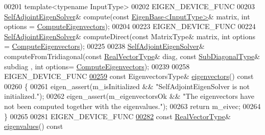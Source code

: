 \begin{DoxyCode}
00201     \textcolor{keyword}{template}<\textcolor{keyword}{typename} InputType>
00202     EIGEN\_DEVICE\_FUNC
00203     \hyperlink{group___eigenvalues___module_class_eigen_1_1_self_adjoint_eigen_solver}{SelfAdjointEigenSolver}& compute(\textcolor{keyword}{const} 
      \hyperlink{group___core___module_struct_eigen_1_1_eigen_base}{EigenBase<InputType>}& matrix, \textcolor{keywordtype}{int} options = 
      \hyperlink{group__enums_ggae3e239fb70022eb8747994cf5d68b4a9ada93d8885bde32b876ba4af01d3292cc}{ComputeEigenvectors});
00204     
00223     EIGEN\_DEVICE\_FUNC
00224     \hyperlink{group___eigenvalues___module_class_eigen_1_1_self_adjoint_eigen_solver}{SelfAdjointEigenSolver}& computeDirect(\textcolor{keyword}{const} MatrixType& matrix, \textcolor{keywordtype}{int} options = 
      \hyperlink{group__enums_ggae3e239fb70022eb8747994cf5d68b4a9ada93d8885bde32b876ba4af01d3292cc}{ComputeEigenvectors});
00225 
00238     \hyperlink{group___eigenvalues___module_class_eigen_1_1_self_adjoint_eigen_solver}{SelfAdjointEigenSolver}& computeFromTridiagonal(\textcolor{keyword}{const} 
      \hyperlink{class_eigen_1_1internal_1_1_tensor_lazy_evaluator_writable}{RealVectorType}& diag, \textcolor{keyword}{const} \hyperlink{group___core___module_class_eigen_1_1_matrix}{SubDiagonalType}& subdiag , \textcolor{keywordtype}{int} options=
      \hyperlink{group__enums_ggae3e239fb70022eb8747994cf5d68b4a9ada93d8885bde32b876ba4af01d3292cc}{ComputeEigenvectors});
00239 
00258     EIGEN\_DEVICE\_FUNC
\hyperlink{group___eigenvalues___module_a7b9f7e641fa46ac4c5f2371405c69b2b}{00259}     \textcolor{keyword}{const} EigenvectorsType& \hyperlink{group___eigenvalues___module_a7b9f7e641fa46ac4c5f2371405c69b2b}{eigenvectors}()\textcolor{keyword}{ const}
00260 \textcolor{keyword}{    }\{
00261       eigen\_assert(m\_isInitialized && \textcolor{stringliteral}{"SelfAdjointEigenSolver is not initialized."});
00262       eigen\_assert(m\_eigenvectorsOk && \textcolor{stringliteral}{"The eigenvectors have not been computed together with the
       eigenvalues."});
00263       \textcolor{keywordflow}{return} m\_eivec;
00264     \}
00265 
00281     EIGEN\_DEVICE\_FUNC
\hyperlink{group___eigenvalues___module_a8efab27e82aa6aa0ae0c64739238c2e0}{00282}     \textcolor{keyword}{const} \hyperlink{class_eigen_1_1internal_1_1_tensor_lazy_evaluator_writable}{RealVectorType}& \hyperlink{group___eigenvalues___module_a8efab27e82aa6aa0ae0c64739238c2e0}{eigenvalues}()\textcolor{keyword}{ const}

\end{DoxyCode}
